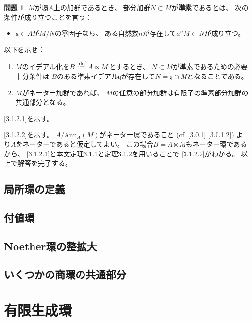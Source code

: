 \documentclass[uplatex]{jsarticle}
\makeatletter
\theoremstyle{definition}
\newtheorem{prob}[prob]{問題}
\renewenvironment{proof}[1][\proofname]{
  \pushQED{\qed}%
  \normalfont \topsep6\p@\@plus6\p@\relax
  \trivlist
  \item[\hskip\labelsep
    #1\@addpunct{\textbf{.}}]\ignorespaces
}{%
  \popQED\endtrivlist\@endpefalse
}
\providecommand{\proofname}{証明}
\newcommand\mfq{\mathfrak{q}}
\def\dfn{:\overset{\mbox{{\scriptsize def}}}{=}}
\makeatother
\begin{document}
\begin{prob}\label{3.1.2}
  \(M\)が環\(A\)上の加群であるとき、
  部分加群\(N\subset M\)が\textbf{準素}であるとは、
  次の条件が成り立つことを言う：
  \begin{itemize}
    \item
    \(a\in A\)が\(M/N\)の零因子なら、
    ある自然数\(n\)が存在して\(a^nM \subset N\)が成り立つ。
  \end{itemize}
  以下を示せ：
  \begin{enumerate}
    \item \label{3.1.2.1}
    \(M\)のイデアル化を\(B\dfn A\ltimes M\)とするとき、
    \(N\subset M\)が準素であるための必要十分条件は
    \(B\)のある準素イデアル\(\mfq\)が存在して\(N = \mfq \cap M\)となることである。
    \item \label{3.1.2.2}
    \(M\)がネーター加群であれば、
    \(M\)の任意の部分加群は有限子の準素部分加群の共通部分となる。
  \end{enumerate}
\end{prob}


\begin{proof}
  \ref{3.1.2.1}を示す。

  \ref{3.1.2.2}を示す。
  \(A/\mathrm{Ann}_A(M)\)がネーター環であること
  (cf. \autoref{3.0.1} \ref{3.0.1.2})
  より\(A\)をネーターであると仮定してよい。
  この場合\(B = A\ltimes M\)もネーター環であるから、
  \ref{3.1.2.1}と本文定理3.1.1と定理3.1.2を用いることで
  \ref{3.1.2.2}がわかる。
  以上で解答を完了する。
\end{proof}




\subsection{局所環の定義}
\subsection{付値環}
\subsection{Noether環の整拡大}
\subsection{いくつかの商環の共通部分}

\section{有限生成環}
\end{document}
